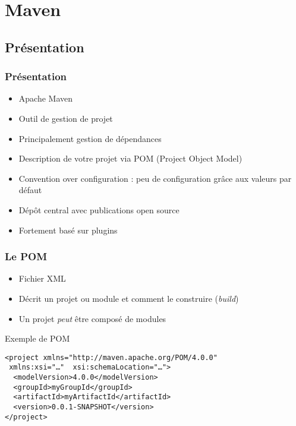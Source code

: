 \documentclass[english, french]{beamer}
\begin{document}
\section{Maven}
\subsection{Présentation}
\begin{frame}
	\frametitle{Présentation}
	\begin{itemize}
		\item Apache Maven
		\item Outil de gestion de projet
		\item Principalement gestion de dépendances
		\item Description de votre projet via POM (Project Object Model)
		\item Convention over configuration : peu de configuration grâce aux valeurs par défaut
		\item Dépôt central avec publications open source
		\item Fortement basé sur plugins
	\end{itemize}
\end{frame}

\begin{frame}[fragile]
	\frametitle{Le POM}
	\begin{itemize}
		\item Fichier XML
		\item Décrit un projet ou module et comment le construire (\emph{build})
		\item Un projet \emph{peut} être composé de modules
	\end{itemize}
	\begin{block}{Exemple de POM}
		\begin{lstlisting}
<project xmlns="http://maven.apache.org/POM/4.0.0"
 xmlns:xsi="…"  xsi:schemaLocation="…">
  <modelVersion>4.0.0</modelVersion>
  <groupId>myGroupId</groupId>
  <artifactId>myArtifactId</artifactId>
  <version>0.0.1-SNAPSHOT</version>
</project>
		\end{lstlisting}
	\end{block}
\end{frame}
\end{document}
